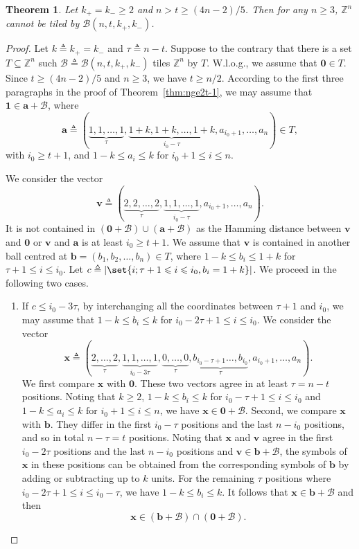\documentclass[sort&compress]{elsarticle}
\DeclarePairedDelimiter\abs{\lvert}{\rvert}
\newcommand{\cB}{\mathcal{B}}
\renewcommand{\leq}{\leqslant}
\renewcommand{\geq}{\geqslant}
\newtheorem{theorem}{Theorem}
\newcommand{\Z}{\mathbb{Z}}
\newcommand{\vv}{\mathbf{v}}
\newcommand{\vx}{\mathbf{x}}
\newcommand{\va}{\mathbf{a}}
\newcommand{\vb}{\mathbf{b}}
\newcommand{\Zero}{{\mathbf{0}}}
\newcommand{\One}{{\mathbf{1}}}
\newcommand{\kp}{k_+}
\newcommand{\km}{k_-}
\newcommand{\BALL}{{\mathcal B}(n,t,\kp,\km)}
\newcommand{\eqdef}{\triangleq}
\begin{document}
\begin{theorem}
  Let $\kp=\km\geq 2$ and $n> t\geq (4n-2)/5$.  Then for any $n\geq 3$, $\Z^n$ cannot be
  tiled by $\BALL$.
\end{theorem}

\begin{proof} Let $k\triangleq \kp=\km$ and    $\tau\eqdef n-t$.
  Suppose to the contrary that there is a set $T\subseteq \Z^n$ such
  $\cB\eqdef\BALL$ tiles $\Z^n$ by $T$. W.l.o.g., we assume that
  $\Zero \in T$. Since $t\geq (4n-2)/5$ and $n\geq 3$, we have $t\geq n/2$. According to the first three paragraphs in the proof of
  Theorem~\ref{thm:nge2t-1}, we may assume that $\One \in \va+\cB$,
  where
  \[\va\triangleq (\underbrace{1,1,\ldots,1}_{\tau}, \underbrace{1+k, 1+k, \ldots, 1+k}_{i_0-\tau}, a_{i_0+1},\ldots,a_n)    \in T,\]
  with $i_0\geq t+1$, and $1-k\leq a_i \leq k$ for $i_0+1\leq i \leq
  n$. 

  We consider the vector
  \[\vv\triangleq  (\underbrace{2,2,\ldots,2}_{\tau}, \underbrace{1, 1, \ldots, 1}_{i_0-\tau}, a_{i_0+1},\ldots,a_n).\]
  It is not contained in $(\Zero+\cB)\cup (\va+\cB)$ as the Hamming
  distance between $\vv$ and $\Zero$ or $\vv$ and $\va$ is at least
  $i_0 \geq t+1$. We assume that $\vv$ is contained in another ball
  centred at $\vb=(b_1,b_2, \ldots, b_n) \in T$, where $1-k\leq b_i
  \leq 1+k$ for $\tau+1 \leq i \leq i_0$. Let $c\triangleq \abs{\set{ i ;
    \tau+1\leq i\leq i_0, b_i=1+k}}$.  We proceed in the following two
  cases.
  
  \begin{enumerate}
  \item
    If $c \leq i_0-3\tau$, by interchanging all the coordinates
    between $\tau+1$ and $i_0$, we may assume that $1-k\leq b_i \leq
    k$ for $i_0-2\tau+1\leq i\leq i_0$. We consider the vector
    \[\vx\triangleq (\underbrace{2,\ldots,2}_{\tau}, \underbrace{1,1,\ldots,1}_{i_0-3\tau}, \underbrace{0,\ldots,0}_{\tau}, \underbrace{b_{i_0-\tau+1} \ldots, b_{i_0}}_{\tau}, a_{i_0+1}, \ldots, a_n).\]
    We first compare $\vx$ with $\Zero$. These two vectors agree in at
    least $\tau=n-t$ positions. Noting that $k\geq 2$, $1-k\leq b_i
    \leq k$ for $i_0-\tau+1\leq i\leq i_0$ and $1-k\leq a_i \leq k
    \textrm{ for } i_0+1\leq i \leq n$, we have $\vx \in
    \Zero+\cB$. Second, we compare $\vx$ with $\vb$. They differ in
    the first $i_0-\tau$ positions and the last $n-i_0$ positions, and
    so in total $n-\tau=t$ positions. Noting that $\vx$ and $\vv$
    agree in the first $i_0-2\tau$ positions and the last $n-i_0$
    positions and $\vv\in \vb+\cB$, the symbols of $\vx$ in these
    positions can be obtained from the corresponding symbols of $\vb$
    by adding or subtracting up to $k$ units.  For the remaining
    $\tau$ positions where $i_0-2\tau+1\leq i\leq i_0-\tau$, we have
    $1-k\leq b_i \leq k$.  It follows that $\vx \in \vb +\cB$ and then
    \[ \vx\in (\vb+\cB)\cap(\Zero+\cB).\]


\end{enumerate}
\end{proof}
\end{document}
